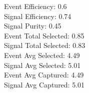 Event  Efficiency:     0.6\\
Signal Efficiency:     0.74\\
Signal Purity:         0.45\\
Event  Total Selected: 0.85\\
Signal Total Selected: 0.83\\
Event  Avg Selected:   4.49\\
Signal Avg Selected:   5.01\\
Event  Avg Captured:   4.49\\
Signal Avg Captured:   5.01